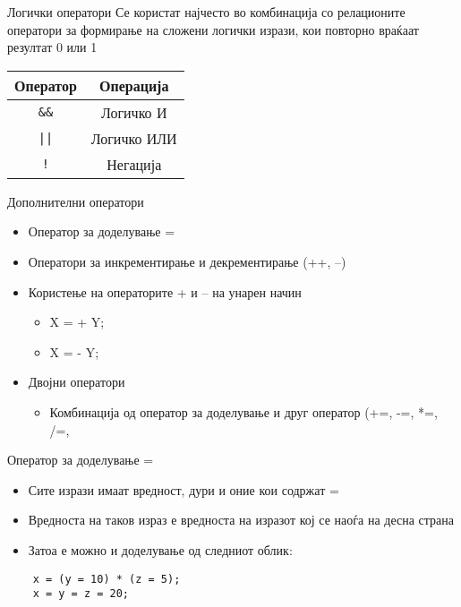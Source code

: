 \begin{frame}{Логички оператори}
Се користат најчесто во комбинација со релационите оператори за формирање на сложени логички изрази, кои повторно враќаат резултат 0 или 1
\linebreak
\begin{center}
\begin{tabular}{c|c}
\textbf{Оператор} & \textbf{Операција}\\
\hline
\texttt{\&\&} & Логичко И \\
\texttt{||} & Логичко ИЛИ \\
\texttt{!} & Негација
\end{tabular}
\end{center}
\end{frame}

\begin{frame}{Дополнителни оператори}
\begin{itemize}
\item Оператор за доделување =
\item Оператори за инкрементирање и декрементирање (++, --)
\item Користење на операторите + и – на унарен начин
\begin{itemize}
\item X = + Y;
\item X = - Y;
\end{itemize}
\item Двојни оператори
\begin{itemize}
\item Комбинација од оператор за доделување и друг оператор (+=, -=, *=, /=, %
\end{itemize}
\end{itemize}
\end{frame}

\begin{frame}[fragile]{Оператор за доделување =}
\begin{itemize}
\item Сите изрази имаат вредност, дури и оние кои содржат =
\item Вредноста на таков израз е вредноста на изразот кој се наоѓа на десна страна
\item Затоа е можно и доделување од следниот облик:
\end{itemize}
\begin{verbatim}
    x = (y = 10) * (z = 5);
    x = y = z = 20;
\end{verbatim}
\end{frame} 

